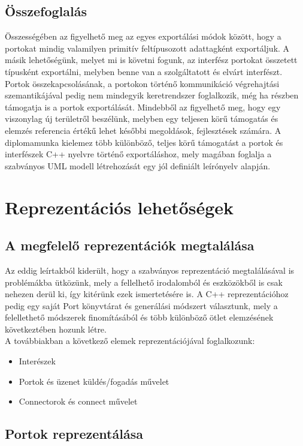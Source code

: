 \documentclass[a4paper,12pt]{report}
\begin{document}
\section{Összefoglalás}
Összességében az figyelhető meg az egyes exportálási módok között, hogy a portokat mindig valamilyen primitív feltípusozott adattagként exportáljuk. A másik lehetőségünk, melyet mi is követni fogunk, az interfész portokat összetett típusként exportálni, melyben benne van a szolgáltatott és elvárt interfészt. Portok összekapcsolásának, a portokon történő kommunikáció végrehajtási szemantikájával pedig nem mindegyik keretrendszer foglalkozik, még ha részben támogatja is a portok exportálását. Mindebből az figyelhető meg, hogy egy viszonylag új területről beszélünk, melyben egy teljesen körű támogatás és elemzés referencia értékű lehet későbbi megoldások, fejlesztések számára. A diplomamunka kielemez több különböző, teljes körű támogatást a portok és interfészek C++ nyelvre történő exportáláshoz, mely magában foglalja a szabványos UML modell létrehozását egy jól definiált leírónyelv alapján.

\chapter{Reprezentációs lehetőségek}
\section{A megfelelő reprezentációk megtalálása}
Az eddig leírtakból kiderült, hogy a szabványos reprezentáció megtalálásával is problémákba ütközünk, mely a fellelhető irodalomból és eszközökből is csak nehezen derül ki, így kitérünk ezek ismertetésére is. A C++ reprezentációhoz pedig egy saját Port könyvtárat és generálási módszert választunk, mely a felellethető módszerek finomításából és több különböző ötlet elemzésének következtében hozunk létre. \\

A továbbiakban a következő elemek reprezentációjával foglalkozunk:
\begin{itemize}
\item Interészek
\item Portok és üzenet küldés/fogadás művelet
\item Connectorok és connect művelet
\end{itemize}

\section{Portok reprezentálása}
\end{document}
